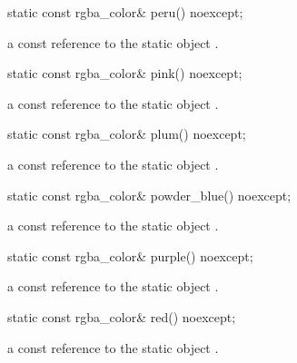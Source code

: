 \begin{itemdecl}
static const rgba_color& peru() noexcept;
\end{itemdecl}
\begin{itemdescr}
\pnum
\returns
a const reference to the static  object .
\end{itemdescr}

\begin{itemdecl}
static const rgba_color& pink() noexcept;
\end{itemdecl}
\begin{itemdescr}
\pnum
\returns
a const reference to the static  object .
\end{itemdescr}

\begin{itemdecl}
static const rgba_color& plum() noexcept;
\end{itemdecl}
\begin{itemdescr}
\pnum
\returns
a const reference to the static  object .
\end{itemdescr}

\begin{itemdecl}
static const rgba_color& powder_blue() noexcept;
\end{itemdecl}
\begin{itemdescr}
\pnum
\returns
a const reference to the static  object .
\end{itemdescr}

\begin{itemdecl}
static const rgba_color& purple() noexcept;
\end{itemdecl}
\begin{itemdescr}
\pnum
\returns
a const reference to the static  object .
\end{itemdescr}

\begin{itemdecl}
static const rgba_color& red() noexcept;
\end{itemdecl}
\begin{itemdescr}
\pnum
\returns
a const reference to the static  object .
\end{itemdescr}

